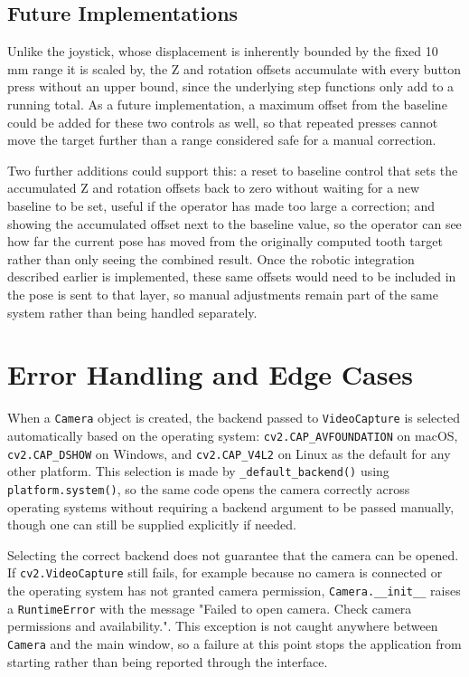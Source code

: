 \subsection{Future Implementations}

Unlike the joystick, whose displacement is inherently bounded by the fixed 10 mm range it is scaled by, the Z and rotation offsets accumulate with every button press without an upper bound, since the underlying step functions only add to a running total. As a future implementation, a maximum offset from the baseline could be added for these two controls as well, so that repeated presses cannot move the target further than a range considered safe for a manual correction.

Two further additions could support this: a reset to baseline control that sets the accumulated Z and rotation offsets back to zero without waiting for a new baseline to be set, useful if the operator has made too large a correction; and showing the accumulated offset next to the baseline value, so the operator can see how far the current pose has moved from the originally computed tooth target rather than only seeing the combined result. Once the robotic integration described earlier is implemented, these same offsets would need to be included in the pose is sent to that layer, so manual adjustments remain part of the same system rather than being handled separately.

\section{Error Handling and Edge Cases}
\label{sec:error_handling}

When a \texttt{Camera} object is created, the backend passed to \texttt{VideoCapture} is selected automatically based on the operating system: \texttt{cv2.CAP\_AVFOUNDATION} on macOS, \texttt{cv2.CAP\_DSHOW} on Windows, and \texttt{cv2.CAP\_V4L2} on Linux as the default for any other platform. This selection is made by \texttt{\_default\_backend()} using \texttt{platform.system()}, so the same code opens the camera correctly across operating systems without requiring a backend argument to be passed manually, though one can still be supplied explicitly if needed.

Selecting the correct backend does not guarantee that the camera can be opened. If \texttt{cv2.VideoCapture} still fails, for example because no camera is connected or the operating system has not granted camera permission, \texttt{Camera.\_\_init\_\_} raises a \texttt{RuntimeError} with the message "Failed to open camera. Check camera permissions and availability.". This exception is not caught anywhere between \texttt{Camera} and the main window, so a failure at this point stops the application from starting rather than being reported through the interface.

